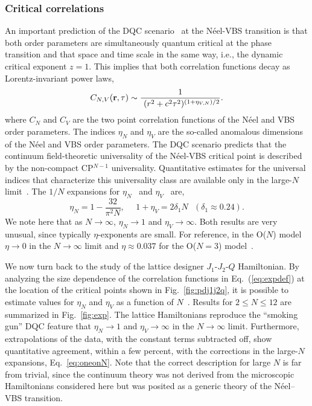 \documentclass[10pt,pre,aps,twocolumn,showpacs,subscriptaddresses,floatfix]{revtex4}
\begin{document}
\subsubsection{Critical correlations}

An important prediction of the DQC scenario~\cite{Senthil04a} at the N\'eel-VBS transition is that both order parameters are
simultaneously quantum critical at the phase transition and that space and time scale in the same way, i.e., the dynamic critical 
exponent $z=1$. This implies that both correlation functions decay as Lorentz-invariant power laws,
\begin{equation}
\label{eq:expdef}
C_{N,V} ({\bf r},\tau) \sim  \frac{1}{~(r^2+c^2\tau^2)^{(1+\eta_{V,N})/2}}.
\end{equation}
 where $C_N$ and $C_V$ are the two point correlation functions of the
 N\'eel and VBS order parameters. The indices $\eta_N$ and $\eta_V$
 are the so-called anomalous dimensions of the N\'eel and VBS order
 parameters. The DQC scenario predicts that
 the continuum field-theoretic universality of the N\'eel-VBS critical
 point is described by the non-compact CP$^{N-1}$ universality. Quantitative
 estimates for the universal indices that characterize this
 universality class are available only in the large-$N$
 limit~\cite{halperin1974:largeN}. The ${1}/{N}$ expansions for $\eta_N$~\cite{kaul2008:u1} and $\eta_V$~\cite{murthy1990:mono,metlitski2008:mono} are,
\begin{equation}
\label{eq:oneonN}
\eta_N = 1 - \frac{32}{\pi^2N},~~~~~~
1+\eta_V = 2 \delta_1 N~~~(\delta_1\approx 0.24).
\end{equation}
We note here that as $N\rightarrow\infty$, $\eta_N \rightarrow 1$ and $\eta_V\rightarrow \infty$. Both results are very unusual, since typically 
$\eta$-exponents are small. For reference, in the O($N$) model $\eta\rightarrow0$ in the $N\rightarrow\infty$ limit and $\eta \approx 0.037$ 
for the O($N=3$) model~\cite{campostrini2002:o3}.

We now turn back to the study of the lattice designer $J_1$-$J_2$-$Q$ Hamiltonian. By analyzing the size dependence of the correlation 
functions in Eq.~(\ref{eq:expdef}) at the location of the critical points shown in Fig.~\ref{fig:pdj1j2q}, it is possible to
estimate values for $\eta_N$ and $\eta_V$ as a function of $N$~\cite{lou2009:sun,kaul2011:j1j2}. Results for $2\leq N \leq 12$ are 
summarized in Fig.~\ref{fig:exp}. The lattice Hamiltonians reproduce the ``smoking gun'' DQC feature that $\eta_N \to 1$ and $\eta_V \to \infty$ in 
the $N\rightarrow \infty$ limit. Furthermore, extrapolations of the data, with the constant terms subtracted off, show quantitative 
agreement, within a few percent, with the corrections in the large-$N$ expansions, Eq.~\ref{eq:oneonN}. Note that the correct description for large 
$N$ is far from trivial, since the continuum theory was not derived from the microscopic Hamiltonians considered here but was posited as a 
generic theory of the N\'eel--VBS transition. 
\end{document}
